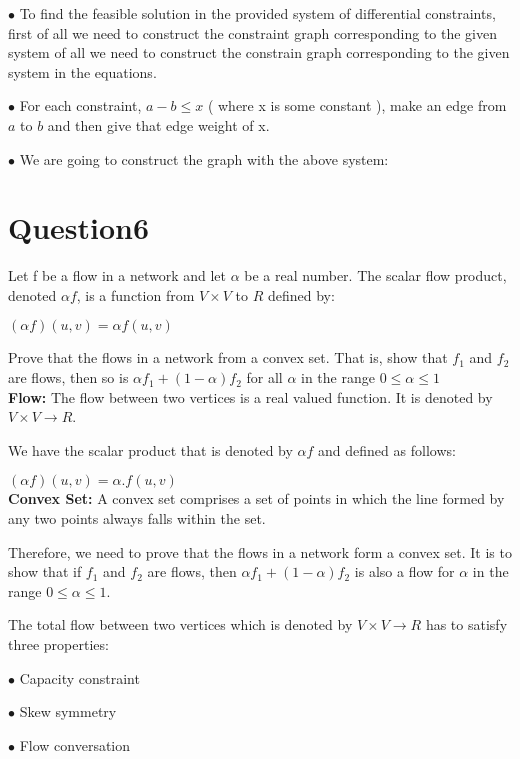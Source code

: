 \documentclass[12]{article}
\begin{document}
$\bullet$ To find the feasible solution in the provided system of differential constraints, first of all we need to construct the constraint graph corresponding to the given system of all we need to construct the constrain graph corresponding to the given system in the equations.

$\bullet$ For each constraint, $a - b \leqslant x$ ( where x is some constant ), make an edge from $a$ to $b$ and then give that edge weight of x.

$\bullet$  We are going to construct the graph with the above system:

\section{Question6} 

Let f be a flow in a network and let $\alpha$ be a real number. The scalar flow product, denoted $\alpha f$, is a function from $V \times V$ to $R$ defined by:

$(\alpha f)(u,v) = \alpha f(u,v)$

Prove that the flows in a network from a convex set. That is, show that $f_1$ and $f_2$ are flows, then so is $\alpha f_1 + ( 1 - \alpha)f_2$ for all $\alpha$ in the range $0 \leqslant \alpha \leqslant 1$ \\

\textbf{Flow: } The flow between two vertices is a real valued function. It is denoted by $V \times V \longrightarrow R$.

We have the scalar product that is denoted by $\alpha f$ and defined as follows: 

$(\alpha f)(u, v) = \alpha . f(u, v)$\\

\textbf{Convex Set: } A convex set comprises a set of points in which the line formed by any two points always falls within the set. 

Therefore, we need to prove that the flows in a network form a convex set. It is to show that if $f_1$ and $f_2$ are flows, then $\alpha f_1 + ( 1 - \alpha)f_2$ is also a flow for $\alpha$ in the range $0 \leqslant \alpha \leqslant 1$.


The total flow between two vertices  which is denoted by  $V \times V \longrightarrow R$ has to satisfy three properties: 

$\bullet$ Capacity constraint

$\bullet$ Skew symmetry

$\bullet$ Flow conversation
\end{document}
